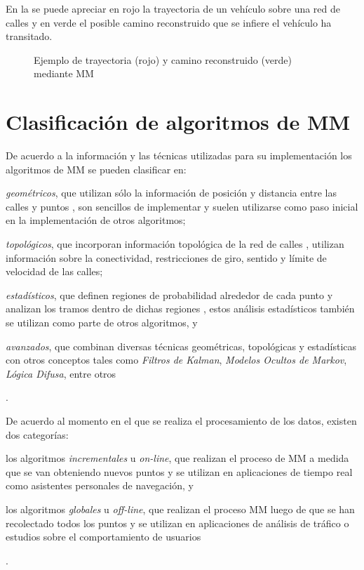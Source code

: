 En la  se puede apreciar en rojo la trayectoria de un vehículo sobre una red de calles y en verde el posible camino reconstruido que se infiere el vehículo ha transitado.

\begin{figure}[h]
	\centering
	
	\caption[Trayectoria y camino reconstruido mediante MM]{Ejemplo de trayectoria (rojo) y camino reconstruido (verde) mediante MM}
	\label{fig:map-matching} 
\end{figure}

\section{Clasificación de algoritmos de MM}

De acuerdo a la información y las técnicas utilizadas para su implementación los algoritmos de MM se pueden clasificar en: \begin{enumerate*}[1)]\item \emph{geométricos}, que utilizan sólo la información de posición y distancia entre las calles y puntos \citep{white2000some}, son sencillos de implementar y suelen utilizarse como paso inicial en la implementación de otros algoritmos; \item \emph{topológicos}, que incorporan información topológica de la red de calles \citep{lou2009map,yuan2010interactive,greenfeld2002matching,quddus2003general}, utilizan información sobre la conectividad, restricciones de giro, sentido y límite de velocidad de las calles; \item \emph{estadísticos}, que definen regiones de probabilidad alrededor de cada punto y analizan los tramos dentro de dichas regiones \citep{ochieng2009map}, estos análisis estadísticos también se utilizan como parte de otros algoritmos, y \item \emph{avanzados}, que combinan diversas técnicas geométricas, topológicas y estadísticas con otros conceptos tales como \emph{Filtros de Kalman}, \emph{Modelos Ocultos de Markov}, \emph{Lógica Difusa}, entre otros \citep{thiagarajan2009vtrack,quddus2006high,thiagarajan2011accurate,fang2011enacq}\end{enumerate*}.

De acuerdo al momento en el que se realiza el procesamiento de los datos, existen dos categorías: \begin{enumerate*}[1)] \item los algoritmos \emph{incrementales} u \emph{on-line}, que realizan el proceso de MM a medida que se van obteniendo nuevos puntos \citep{thiagarajan2009vtrack,thiagarajan2011accurate,greenfeld2002matching,quddus2003general,quddus2006high} y se utilizan en aplicaciones de tiempo real como asistentes personales de navegación, y \item los algoritmos \emph{globales} u \emph{off-line}, que realizan el proceso MM luego de que se han recolectado todos los puntos \citep{lou2009map,yuan2010interactive} y se utilizan en aplicaciones de análisis de tráfico o estudios sobre el comportamiento de usuarios\end{enumerate*}.

